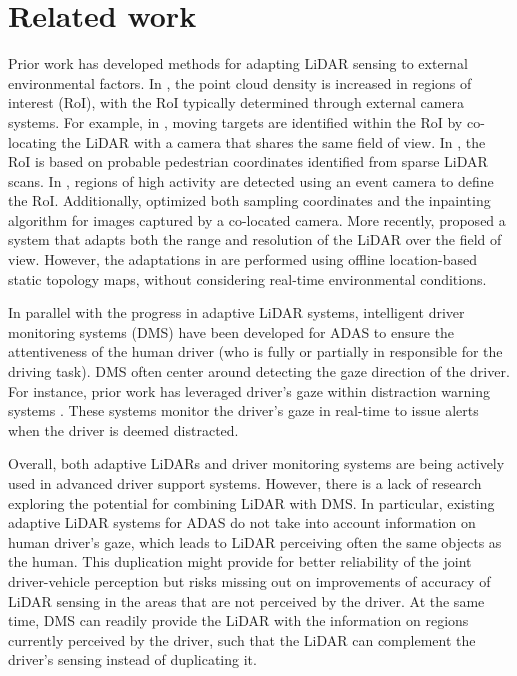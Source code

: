 \section{Related work}
Prior work has developed methods for adapting LiDAR sensing to external environmental factors. In \cite{b3, b4, b5, b6}, the point cloud density is increased in regions of interest (RoI), with the RoI typically determined through external camera systems. For example, in \cite{b3}, moving targets are identified within the RoI by co-locating the LiDAR with a camera that shares the same field of view. In \cite{b4}, the RoI is based on probable pedestrian coordinates identified from sparse LiDAR scans. In \cite{b5}, regions of high activity are detected using an event camera to define the RoI. Additionally, \cite{b6} optimized both sampling coordinates and the inpainting algorithm for images captured by a co-located camera. More recently, \cite{b7} proposed a system that adapts both the range and resolution of the LiDAR over the field of view. However, the adaptations in \cite{b7} are performed using offline location-based static topology maps, without considering real-time environmental conditions.

In parallel with the progress in adaptive LiDAR systems, intelligent driver monitoring systems (DMS) have been developed for ADAS to ensure the attentiveness of the human driver (who is fully or partially in responsible for the driving task). DMS often center around detecting the gaze direction of the driver. For instance, prior work has leveraged driver’s gaze within distraction warning systems \cite{b8, b9, b10, b11}. These systems monitor the driver’s gaze in real-time to issue alerts when the driver is deemed distracted. 

Overall, both adaptive LiDARs and driver monitoring systems are being actively used in advanced driver support systems. However, there is a lack of research exploring the potential for combining LiDAR with DMS. In particular, existing adaptive LiDAR systems for ADAS do not take into account information on human driver's gaze, which leads to LiDAR perceiving often the same objects as the human. This duplication might provide for better reliability of the joint driver-vehicle perception but risks missing out on improvements of accuracy of LiDAR sensing in the areas that are not  perceived by the driver. At the same time, DMS can readily provide the LiDAR with the information on regions currently perceived by the driver, such that the LiDAR can complement the driver's sensing instead of duplicating it.